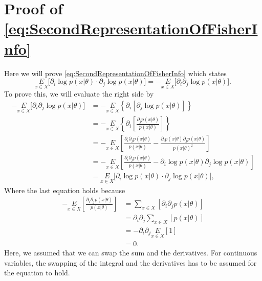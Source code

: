 \section{Proof of \cref{eq:SecondRepresentationOfFisherInfo}}
\label{sec:ProofForeq:SecondRepresentationOfFisherInfo}
Here we will prove \cref{eq:SecondRepresentationOfFisherInfo} which states \begin{equation}
	\underset{x\in X}{E} \Big[\partial_i\log p(x|\theta) \cdot \partial_j\log p(x|\theta) \Big] = -\underset{x\in X}{E} \Big[\partial_i\partial_j\log p(x|\theta)\Big].
\end{equation}
To prove this, we will evaluate the right side by 
\newcommand{\p}{p(x|\theta)}
\begin{equation}
	\begin{split}
		-\underset{x\in X}{E} \Big[\partial_i\partial_j\log p(x|\theta)\Big] &= -\underset{x\in X}{E} \left\{\partial_i\left[\partial_j\log p(x|\theta)\right]\right\} \\
		&= -\underset{x\in X}{E} \left\{\partial_i\left[\frac{\partial_j p(x|\theta)}{p(x|\theta)}\right]\right\}\\
		&= -\underset{x\in X}{E} \left[\frac{\partial_i\partial_j p(x|\theta)}{p(x|\theta)} - \frac{\partial_i\p \partial_j \p}{\p^2}\right]\\
		&= -\underset{x\in X}{E} \left[\frac{\partial_i\partial_j p(x|\theta)}{p(x|\theta)} - \partial_i\log\p \partial_j \log\p\right]\\
		&= \underset{x\in X}{E} \Big[\partial_i\log p(x|\theta) \cdot \partial_j\log p(x|\theta) \Big],
	\end{split}
\end{equation}
Where the last equation holds because 
\begin{equation}
	\begin{split}
		-\underset{x\in X}{E} \left[\frac{\partial_i\partial_j p(x|\theta)}{p(x|\theta)}\right] &= \sum_{x\in X} \left[ \partial_i\partial_j p(x|\theta) \right]\\
		&= \partial_i \partial_j \sum_{x\in X} \left[ p(x|\theta) \right]\\
		&= -\partial_i \partial_j \underset{x\in X}{E} \left[1\right]\\
		&= 0.
	\end{split} 
\end{equation}
Here, we assumed that we can swap the sum and the derivatives. For continuous variables, the swapping of the integral and the derivatives has to be assumed for the equation to hold.